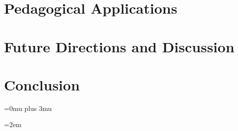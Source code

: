 \documentclass[10pt,twocolumn]{article}
\begin{document}
\section{Pedagogical Applications}


\section{Future Directions and Discussion}


\section{Conclusion}


\appendix



% 
% 
% 
% 

\nocite{*}

\makeatletter
\def\url@leostyle{\@ifundefined{selectfont}{\def\UrlFont{\sf}}{\def\UrlFont{\small\ttfamily}}}
\makeatother
{}

\Urlmuskip=0mu plus 3mu

\sloppy
\emergencystretch=2em



\end{document}
